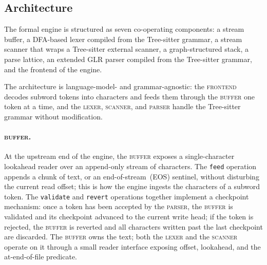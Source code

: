 \documentclass[11pt]{article}
\theoremstyle{plain}
\theoremstyle{definition}
\begin{document}
\subsection{Architecture}
\label{sec:engine-arch}

The formal engine is structured as seven co-operating components: a stream
buffer, a DFA-based lexer compiled from the Tree-sitter grammar, a stream
scanner that wraps a Tree-sitter external scanner, a graph-structured stack, a
parse lattice, an extended GLR parser compiled from the Tree-sitter grammar, and
the frontend of the engine.

The architecture is language-model- and grammar-agnostic: the \textsc{frontend}
decodes subword tokens into characters and feeds them through the
\textsc{buffer} one token at a time, and the \textsc{lexer}, \textsc{scanner},
and \textsc{parser} handle the Tree-sitter grammar without modification.

\paragraph{\textsc{buffer}.} At the upstream end of the engine, the
\textsc{buffer} exposes a single-character lookahead reader over an append-only
stream of characters. The \texttt{feed} operation appends a chunk of text, or an
end-of-stream~(EOS) sentinel, without disturbing the current read offset; this
is how the engine ingests the characters of a subword token. The
\texttt{validate} and \texttt{revert} operations together implement a checkpoint
mechanism: once a token has been accepted by the \textsc{parser}, the
\textsc{buffer} is validated and its checkpoint advanced to the current write
head; if the token is rejected, the \textsc{buffer} is reverted and all
characters written past the last checkpoint are discarded. The \textsc{buffer}
owns the text; both the \textsc{lexer} and the \textsc{scanner} operate on it
through a small reader interface exposing offset, lookahead, and the
at-end-of-file predicate.
\end{document}
